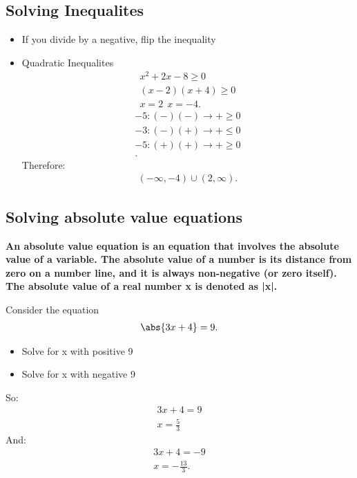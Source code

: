 \documentclass{report}
\begin{document}
    \subsection{Solving Inequalites}
    \begin{itemize}
      \item If you divide by a negative, flip the inequality
      \item Quadratic Inequalites
        \begin{align*}
          x^{2} + 2x - 8 \geq 0 \\
          (x-2)(x+4) \ge 0 \\
          x = 2\ \ x=-4
        .\end{align*}
        \begin{align*}
          -5: (-)(-) \rightarrow + \geq 0 \\
          -3: (-)(+) \rightarrow + \leq 0 \\
          -5: (+)(+) \rightarrow + \geq 0 \\
        .\end{align*}
        Therefore:
        \begin{align*}
          (-\infty, -4) \cup (2,\infty)
        .\end{align*}
        \begin{figure}[ht]
            \centering
            \label{fig:qi}
        \end{figure}
    \end{itemize}

    \bigbreak \noindent 
    \bigbreak \noindent \bigbreak \noindent 
    \subsection{Solving absolute value equations}
    \bigbreak \noindent 
    \smallbreak \noindent
    \begin{definition}
    \textbf{      An absolute value equation is an equation that involves the absolute value of a variable. The absolute value of a number is its distance from zero on a number line, and it is always non-negative (or zero itself). The absolute value of a real number x is denoted as |x|.} 
    \end{definition}
    \bigbreak \noindent 

    Consider the equation 
    \begin{align*}
        \abs{3x+4} = 9
    .\end{align*}
    \begin{itemize}
        \item Solve for x with positive 9
        \item Solve for x with negative 9
    \end{itemize}
    \bigbreak \noindent
    So:
    \begin{align*}
      3x+4 = 9 \\
      x = \frac{5}{3}
    \end{align*}
    \bigbreak \noindent 
    And:
    \begin{align*}
      3x+4 = -9 \\
      x = -\frac{13}{3}
    .\end{align*}
\end{document}
